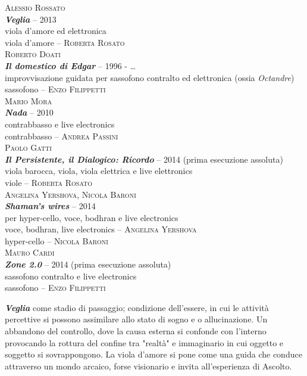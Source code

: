 \documentclass[9pt, twoside, a5paper]{extreport}
\newcommand{\brano}[6]{%
\noindent \textsc{#1}\\ %
\noindent \textbf{\textit{#2}} -- #3\\%
\noindent #4\\ %
\noindent #5 -- \textsc{#6}%
\\
}%
\newcommand{\descrizione}[2]{%
\noindent \textbf{\textit{#1}} %
#2 %
\\
}%
\begin{document}
\begin{multicols}{2}

\brano{Alessio Rossato}
{Veglia}{2013}
{viola d'amore ed elettronica}
{viola d'amore}{Roberta Rosato}


\brano{Roberto Doati}
{Il domestico di Edgar}{1996 - \dots}
{improvvisazione guidata per sassofono contralto ed elettronica (ossia \textit{Octandre})}
{sassofono}{Enzo Filippetti}


\brano{Mario Mora}
{Nada}{2010}
{contrabbasso e live electronics}
{contrabbasso}{Andrea Passini}


\brano{Paolo Gatti}
{Il Persistente, il Dialogico: Ricordo}{2014 (prima esecuzione assoluta)}
{viola barocca, viola, viola elettrica e live elettronics}
{viole}{Roberta Rosato}


\brano{Angelina Yershova, Nicola Baroni}
{Shaman's wires}{2014}
{per hyper-cello, voce, bodhran e live electronics}
{voce, bodhran, live electronics}{Angelina Yershova}
hyper-cello -- \textsc{Nicola Baroni}
\\



\brano{Mauro Cardi}
{Zone 2.0}{2014 (prima esecuzione assoluta)}
{sassofono contralto e live electronics}
{sassofono}{Enzo Filippetti}


%
\vspace{-5mm}

\descrizione{Veglia}{come stadio di passaggio; condizione dell'essere, in cui le attività percettive si possono assimilare allo stato di sogno e o allucinazione. Un abbandono del controllo, dove la causa esterna si confonde con l'interno provocando la rottura del confine tra "realtà" e immaginario in cui oggetto e soggetto si sovrappongono. La viola d’amore si pone come una guida che conduce attraverso un mondo arcaico, forse visionario e invita all’esperienza di Ascolto.}



\end{multicols}
\end{document}
